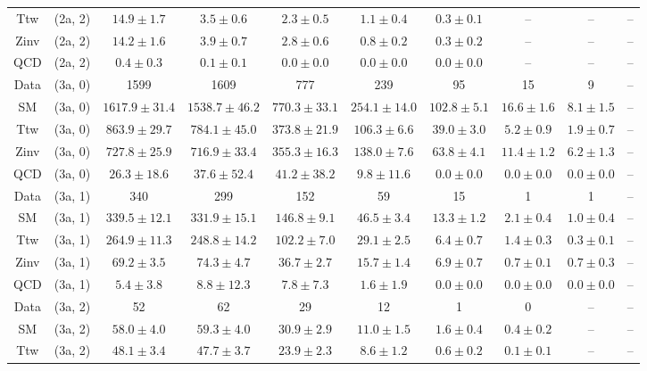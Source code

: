 \begin{table}[h!]
{\begin{tabular}{cccccccccc}
	Ttw & (2a, 2) & $14.9\pm 1.7$ & $3.5\pm 0.6$ & $2.3\pm 0.5$ & $1.1\pm 0.4$ & $0.3\pm 0.1$ & -- & -- & -- \\[0.5ex] 
	Zinv & (2a, 2) & $14.2\pm 1.6$ & $3.9\pm 0.7$ & $2.8\pm 0.6$ & $0.8\pm 0.2$ & $0.3\pm 0.2$ & -- & -- & -- \\[0.5ex] 
	QCD & (2a, 2) & $0.4\pm 0.3$ & $0.1\pm 0.1$ & $0.0\pm 0.0$ & $0.0\pm 0.0$ & $0.0\pm 0.0$ & -- & -- & -- \\[0.5ex] 
	Data & (3a, 0) & 1599 & 1609 & 777 & 239 & 95 & 15 & 9 & -- \\[0.5ex] 
	SM & (3a, 0) & $1617.9\pm 31.4$ & $1538.7\pm 46.2$ & $770.3\pm 33.1$ & $254.1\pm 14.0$ & $102.8\pm 5.1$ & $16.6\pm 1.6$ & $8.1\pm 1.5$ & -- \\[0.5ex] 
	Ttw & (3a, 0) & $863.9\pm 29.7$ & $784.1\pm 45.0$ & $373.8\pm 21.9$ & $106.3\pm 6.6$ & $39.0\pm 3.0$ & $5.2\pm 0.9$ & $1.9\pm 0.7$ & -- \\[0.5ex] 
	Zinv & (3a, 0) & $727.8\pm 25.9$ & $716.9\pm 33.4$ & $355.3\pm 16.3$ & $138.0\pm 7.6$ & $63.8\pm 4.1$ & $11.4\pm 1.2$ & $6.2\pm 1.3$ & -- \\[0.5ex] 
	QCD & (3a, 0) & $26.3\pm 18.6$ & $37.6\pm 52.4$ & $41.2\pm 38.2$ & $9.8\pm 11.6$ & $0.0\pm 0.0$ & $0.0\pm 0.0$ & $0.0\pm 0.0$ & -- \\[0.5ex] 
	Data & (3a, 1) & 340 & 299 & 152 & 59 & 15 & 1 & 1 & -- \\[0.5ex] 
	SM & (3a, 1) & $339.5\pm 12.1$ & $331.9\pm 15.1$ & $146.8\pm 9.1$ & $46.5\pm 3.4$ & $13.3\pm 1.2$ & $2.1\pm 0.4$ & $1.0\pm 0.4$ & -- \\[0.5ex] 
	Ttw & (3a, 1) & $264.9\pm 11.3$ & $248.8\pm 14.2$ & $102.2\pm 7.0$ & $29.1\pm 2.5$ & $6.4\pm 0.7$ & $1.4\pm 0.3$ & $0.3\pm 0.1$ & -- \\[0.5ex] 
	Zinv & (3a, 1) & $69.2\pm 3.5$ & $74.3\pm 4.7$ & $36.7\pm 2.7$ & $15.7\pm 1.4$ & $6.9\pm 0.7$ & $0.7\pm 0.1$ & $0.7\pm 0.3$ & -- \\[0.5ex] 
	QCD & (3a, 1) & $5.4\pm 3.8$ & $8.8\pm 12.3$ & $7.8\pm 7.3$ & $1.6\pm 1.9$ & $0.0\pm 0.0$ & $0.0\pm 0.0$ & $0.0\pm 0.0$ & -- \\[0.5ex] 
	Data & (3a, 2) & 52 & 62 & 29 & 12 & 1 & 0 & -- & -- \\[0.5ex] 
	SM & (3a, 2) & $58.0\pm 4.0$ & $59.3\pm 4.0$ & $30.9\pm 2.9$ & $11.0\pm 1.5$ & $1.6\pm 0.4$ & $0.4\pm 0.2$ & -- & -- \\[0.5ex] 
	Ttw & (3a, 2) & $48.1\pm 3.4$ & $47.7\pm 3.7$ & $23.9\pm 2.3$ & $8.6\pm 1.2$ & $0.6\pm 0.2$ & $0.1\pm 0.1$ & -- & -- \\[0.5ex] 

\end{tabular}}
\end{table}
